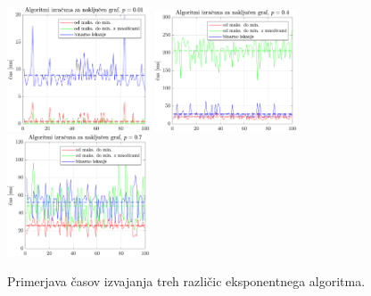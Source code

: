 \documentclass{beamer}
\begin{document}
\begin{frame}{}
    \begin{figure}
        \centering
        \includegraphics[width=120pt]{../koda/results/plots/zfn_random_15_sparse.pdf}
        \includegraphics[width=120pt]{../koda/results/plots/zfn_random_15_mid.pdf}
        \includegraphics[width=120pt]{../koda/results/plots/zfn_random_15_dense.pdf}
        \caption{Primerjava časov izvajanja treh različic eksponentnega algoritma.}
    \end{figure}
\end{frame}
\end{document}
